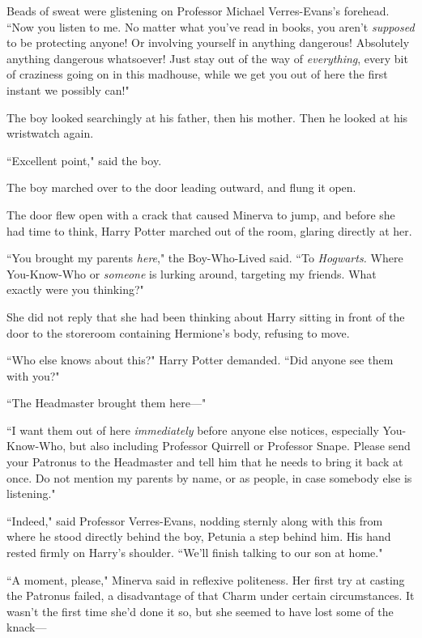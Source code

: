 Beads of sweat were glistening on Professor Michael Verres-Evans's forehead. ``Now you listen to me. No matter what you've read in books, you aren't \emph{supposed} to be protecting anyone! Or involving yourself in anything dangerous! Absolutely anything dangerous whatsoever! Just stay out of the way of \emph{everything}, every bit of craziness going on in this madhouse, while we get you out of here the first instant we possibly can!"

The boy looked searchingly at his father, then his mother. Then he looked at his wristwatch again.

``Excellent point," said the boy.

The boy marched over to the door leading outward, and flung it open.

\later

The door flew open with a crack that caused Minerva to jump, and before she had time to think, Harry Potter marched out of the room, glaring directly at her.

``You brought my parents \emph{here}," the Boy-Who-Lived said. ``To \emph{Hogwarts.} Where You-Know-Who or \emph{someone} is lurking around, targeting my friends. What exactly were you thinking?"

She did not reply that she had been thinking about Harry sitting in front of the door to the storeroom containing Hermione's body, refusing to move.

``Who else knows about this?" Harry Potter demanded. ``Did anyone see them with you?"

``The Headmaster brought them here—"

``I want them out of here \emph{immediately} before anyone else notices, especially You-Know-Who, but also including Professor Quirrell or Professor Snape. Please send your Patronus to the Headmaster and tell him that he needs to bring it back at once. Do not mention my parents by name, or as people, in case somebody else is listening."

``Indeed," said Professor Verres-Evans, nodding sternly along with this from where he stood directly behind the boy, Petunia a step behind him. His hand rested firmly on Harry's shoulder. ``We'll finish talking to our son at home."

``A moment, please," Minerva said in reflexive politeness. Her first try at casting the Patronus failed, a disadvantage of that Charm under certain circumstances. It wasn't the first time she'd done it so, but she seemed to have lost some of the knack—


